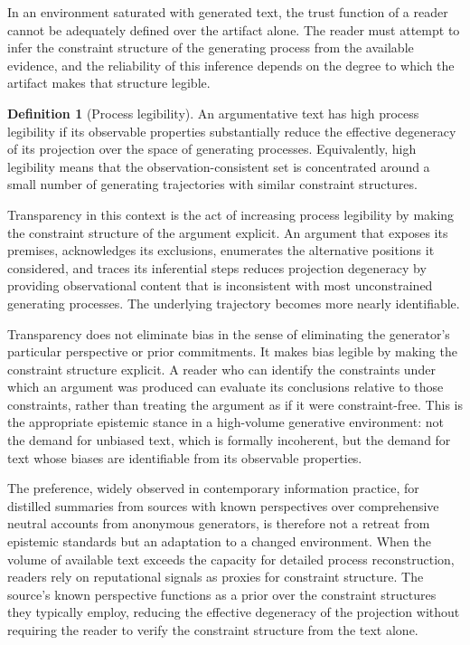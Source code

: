 \documentclass[12pt, oneside]{article}
\theoremstyle{plain}
\theoremstyle{definition}
\newtheorem{definition}[theorem]{Definition}
\theoremstyle{remark}
\begin{document}
In an environment saturated with generated text, the trust function of a reader cannot be
adequately defined over the artifact alone. The reader must attempt to infer the constraint
structure of the generating process from the available evidence, and the reliability of this
inference depends on the degree to which the artifact makes that structure legible.

\begin{definition}[Process legibility]
An argumentative text has high process legibility if its observable properties substantially
reduce the effective degeneracy of its projection over the space of generating processes.
Equivalently, high legibility means that the observation-consistent set is concentrated
around a small number of generating trajectories with similar constraint structures.
\end{definition}

Transparency in this context is the act of increasing process legibility by making the
constraint structure of the argument explicit. An argument that exposes its premises,
acknowledges its exclusions, enumerates the alternative positions it considered, and traces
its inferential steps reduces projection degeneracy by providing observational content that
is inconsistent with most unconstrained generating processes. The underlying trajectory
becomes more nearly identifiable.

Transparency does not eliminate bias in the sense of eliminating the generator's particular
perspective or prior commitments. It makes bias legible by making the constraint structure
explicit. A reader who can identify the constraints under which an argument was produced
can evaluate its conclusions relative to those constraints, rather than treating the argument
as if it were constraint-free. This is the appropriate epistemic stance in a high-volume
generative environment: not the demand for unbiased text, which is formally incoherent, but
the demand for text whose biases are identifiable from its observable properties.

The preference, widely observed in contemporary information practice, for distilled summaries
from sources with known perspectives over comprehensive neutral accounts from anonymous
generators, is therefore not a retreat from epistemic standards but an adaptation to a
changed environment. When the volume of available text exceeds the capacity for detailed
process reconstruction, readers rely on reputational signals as proxies for constraint
structure. The source's known perspective functions as a prior over the constraint structures
they typically employ, reducing the effective degeneracy of the projection without requiring
the reader to verify the constraint structure from the text alone.
\end{document}
